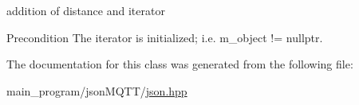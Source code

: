 addition of distance and iterator 

\begin{DoxyPrecond}{Precondition}
The iterator is initialized; i.\+e. {\ttfamily m\+\_\+object != nullptr}. 
\end{DoxyPrecond}


The documentation for this class was generated from the following file\+:\begin{DoxyCompactItemize}
\item 
main\+\_\+program/json\+M\+Q\+T\+T/\hyperlink{json_8hpp}{json.\+hpp}\end{DoxyCompactItemize}
